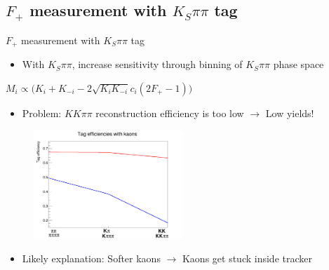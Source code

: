 \documentclass{beamer}
\begin{document}
\subsection{\texorpdfstring{$F_+$}{F+} measurement with \texorpdfstring{$K_S\pi\pi$}{KSpipi} tag}

\begin{frame}{$F_+$ measurement with $K_S\pi\pi$ tag}
  \begin{itemize}
    \item{With $K_S\pi\pi$, increase sensitivity through binning of $K_S\pi\pi$ phase space}
  \end{itemize}
  \begin{center}
    $M_i\propto\big(K_i + K_{-i} - 2\sqrt{K_iK_{-i}}c_i(2F_+ - 1)\big)$
  \end{center}
  \begin{itemize}
    \item{Problem: $KK\pi\pi$ reconstruction efficiency is too low $\to$ Low yields!}
  \end{itemize}
  \begin{figure}
    \includegraphics[width = 0.5\textwidth]{Plots/KaonTrackingEfficiency.png}
  \end{figure}
  \begin{itemize}
    \item{Likely explanation: Softer kaons $\to$ Kaons get stuck inside tracker}
  \end{itemize}
\end{frame}
\end{document}
